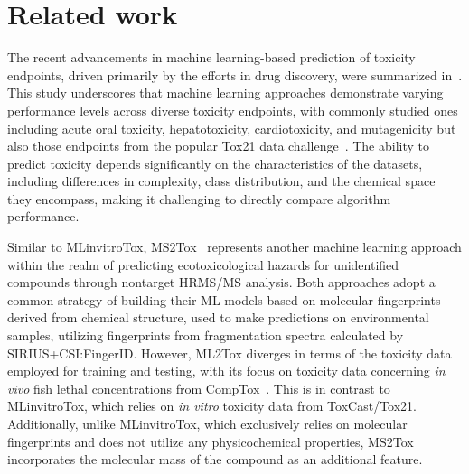 \chapter{Related work}\label{chap:related_work}

The recent advancements in machine learning-based prediction of toxicity endpoints, driven primarily by the efforts in drug discovery, were summarized in~\cite{cavasotto2022}. This study underscores that machine learning approaches demonstrate varying performance levels across diverse toxicity endpoints, with commonly studied ones including acute oral toxicity, hepatotoxicity, cardiotoxicity, and mutagenicity but also those endpoints from the popular Tox21 data challenge~\cite{richard2021}. The ability to predict toxicity depends significantly on the characteristics of the datasets, including differences in complexity, class distribution, and the chemical space they encompass, making it challenging to directly compare algorithm performance.

Similar to MLinvitroTox, MS2Tox~\cite{peets2022} represents another machine learning approach within the realm of predicting ecotoxicological hazards for unidentified compounds through nontarget HRMS/MS analysis. Both approaches adopt a common strategy of building their ML models based on molecular fingerprints derived from chemical structure, used to make predictions on environmental samples, utilizing fingerprints from fragmentation spectra calculated by SIRIUS+CSI:FingerID. However, ML2Tox diverges in terms of the toxicity data employed for training and testing, with its focus on toxicity data concerning \emph{in vivo} fish lethal concentrations from CompTox~\cite{williams2017}. This is in contrast to MLinvitroTox, which relies on \emph{in vitro} toxicity data from ToxCast/Tox21. Additionally, unlike MLinvitroTox, which exclusively relies on molecular fingerprints and does not utilize any physicochemical properties, MS2Tox incorporates the molecular mass of the compound as an additional feature.

